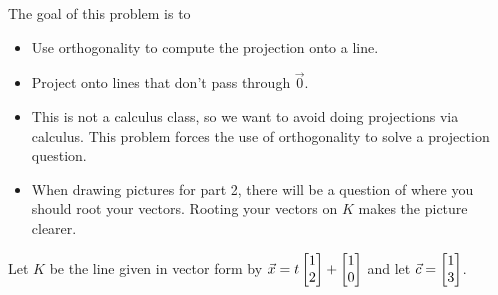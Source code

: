 \documentclass{problemset}
\newcommand{\bookonlynewpage}{\begin{bookonly}\newpage\end{bookonly}}
\begin{document}
	\bookonlynewpage
	\question
	\begin{annotation}
		\begin{goals}

			The goal of this problem is to
			\begin{itemize}
				\item Use orthogonality to compute the projection onto a line.
				\item Project onto lines that don't pass through $\vec 0$.
			\end{itemize}
		\end{goals}

		\begin{notes}
			\begin{itemize}
				\item This is not a calculus class, so we want to avoid
					doing projections via calculus. This problem forces
					the use of orthogonality to solve a projection question.
				\item When drawing pictures for part 2, there will be a question
					of where you should root your vectors. Rooting your vectors
					on $K$ makes the picture clearer.
			\end{itemize}
		\end{notes}
	\end{annotation}
	Let $K$ be the line given in vector form by $\vec x=t\mat{1\\2}+\mat{1\\0}$ and let
	$\vec c=\mat{1\\3}$.
\end{document}
